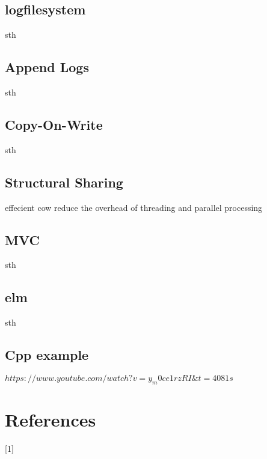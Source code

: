 \documentclass[conference]{IEEEtran}
\begin{document}
\subsection{logfilesystem}
sth
\subsection{Append Logs}
sth
\subsection{Copy-On-Write}
sth
\subsection{Structural Sharing}
effecient cow reduce the overhead of threading and parallel processing
\subsection{MVC}
sth
\subsection{elm}
sth
\subsection{Cpp example}
$https://www.youtube.com/watch?v=y_m0ce1rzRI\&t=4081s$
\section*{References}
[1] 


\end{document}
